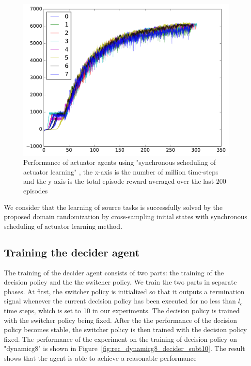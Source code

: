 \begin{figure}[!htbp]
	\includegraphics[width=\textwidth]{images/rec_sync_training.pdf}
	\centering
	\caption{Performance of actuator agents using "synchronous scheduling of actuator learning" , the x-axis is the number of million time-steps and the y-axis is the total episode reward averaged over the last 200 episodes}\label{rec_sync_training}
\end{figure}

We consider that the learning of source tasks is successfully solved by the proposed domain randomization by cross-sampling initial states with  synchronous scheduling of actuator learning method.
\subsection{Training the decider agent}
The training of the decider agent consists of two parts: the training of the decision policy and the the switcher policy. We train the two parts in separate phases. At first, the switcher policy is initialized so that it outputs a termination signal whenever the current decision policy has been executed for no less than $l_c$ time steps, which is set to 10 in our experiments. The decision policy is trained with the switcher policy being fixed. After the the performance of the decision policy becomes stable, the switcher policy is then trained with the decision policy fixed.
The performance of the experiment on the training of decision policy on "dynamicg8" is shown in Figure~\ref{fig:rec_dynamicg8_decider_subt10}. The result shows that the agent is able to achieve a reasonable performance 

